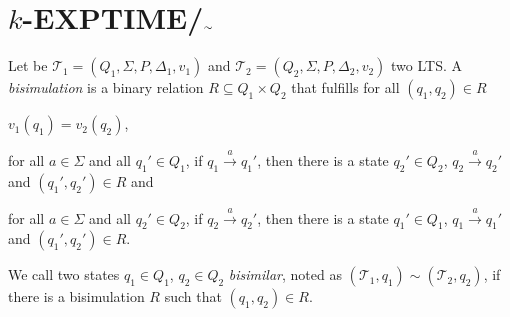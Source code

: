 
\section{$k$-EXPTIME/$_{\raise.17ex\hbox{$\scriptstyle\sim$}}$}

\begin{frame}

    \begin{example}
        \begin{center}
        \end{center}
    \end{example}

\end{frame}

\begin{frame}
    \begin{definition}
        Let be $\mathcal{T}_1 = (Q_1, \Sigma, P, \Delta_1, v_1)$ and $\mathcal{T}_2 = (Q_2, \Sigma, P, \Delta_2, v_2)
        $ two LTS. A \emph{bisimulation} is a binary relation $R \subseteq Q_1 \times Q_2$ that fulfills for all $(q_1,
        q_2) \in R$
        \begin{compactitem}
            \item $v_1 (q_1) = v_2 (q_2)$,
            \item for all $a \in \Sigma$ and all $q_1' \in Q_1$, if $q_1 \overset{a}{\rightarrow} q_1'$, then there
            is a state $q_2' \in Q_2$, $q_2 \overset{a}{\rightarrow} q_2'$ and $(q_1', q_2') \in R$ and
            \item for all $a \in \Sigma$ and all $q_2' \in Q_2$, if $q_2 \overset{a}{\rightarrow} q_2'$, then there is a
            state $q_1' \in Q_1$, $q_1 \overset{a}{\rightarrow} q_1'$ and $(q_1', q_2') \in R$.
        \end{compactitem}
        We call two states $q_1 \in Q_1$, $q_2 \in Q_2$ \emph{bisimilar}, noted as $(\mathcal{T}_1, q_1) \sim
        (\mathcal{T}_2, q_2)$, if there
        is a bisimulation $R$ such that $(q_1, q_2) \in R$.
    \end{definition}
\end{frame}

